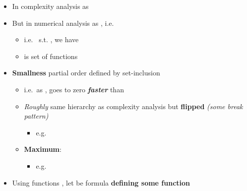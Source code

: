 \begin{itemize}

\item
  In complexity analysis  as 
\item
  But in numerical analysis  as
  ,
  i.e.~

  \begin{itemize}
  
  \item
    i.e.~ s.t. \iMbox{\forall \epsilon}, we
    have
  \item
     is set of functions
  \end{itemize}
\item
  \textbf{Smallness} partial order 
  defined by set-inclusion 

  \begin{itemize}
  
  \item
    i.e.~as ,  goes to zero
    \textbf{\emph{faster}} than 
  \item
    \emph{Roughly} same hierarchy as complexity analysis but
    \textbf{flipped} \emph{(some break pattern)}

    \begin{itemize}
    
    \item
      e.g.~
    \end{itemize}
  \item
    \textbf{Maximum}:

    \begin{itemize}
    
    \item
      e.g.~
    \end{itemize}
  \end{itemize}
\item
  Using functions , let
   be formula
  \textbf{defining some function}


\end{itemize}
